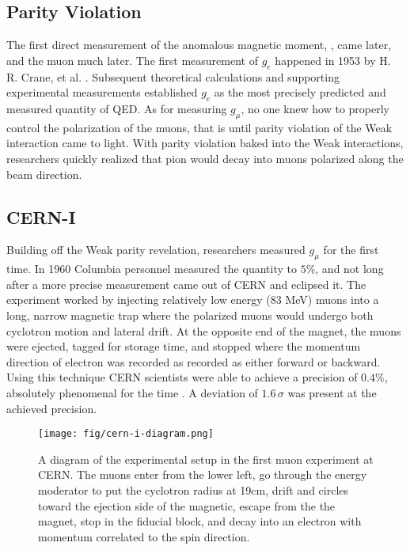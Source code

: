 \subsection{Parity Violation}
The first direct measurement of the anomalous magnetic moment, \gmtwo, came later, and the muon \gmtwo much later.  The first measurement of $g_e$ happened in 1953 by H. R. Crane, et al. .  Subsequent theoretical calculations and supporting experimental measurements established $g_e$ as the most precisely predicted and measured quantity of QED.  As for measuring $g_\mu$, no one knew how to properly control the polarization of the muons, that is until parity violation of the Weak interaction came to light.  With parity violation baked into the Weak interactions, researchers quickly realized that pion would decay into muons polarized along the beam direction.  

\subsection{CERN-I}
Building off the Weak parity revelation, researchers measured $g_\mu$ for the first time.  In 1960 Columbia personnel measured the quantity to $5\%$, and not long after a more precise measurement came out of CERN and eclipsed it.  The experiment worked by injecting relatively low energy (83 MeV) muons into a long, narrow magnetic trap where the polarized muons would undergo both cyclotron motion and lateral drift. At the opposite end of the magnet, the muons were ejected, tagged for storage time, and stopped where the momentum direction of electron was recorded as recorded as either forward or backward.  Using this technique CERN scientists were able to achieve a precision of $0.4\%$, absolutely phenomenal for the time \cite{cern-i}.  A deviation of $1.6\,\sigma$ was present at the achieved precision.

\begin{figure}
\centering
\texttt{[image: fig/cern-i-diagram.png]}
\label{fig:cern-i-diagram}
\caption{A diagram of the experimental setup in the first muon \gmtwo experiment at CERN. The muons enter from the lower left, go through the energy moderator to put the cyclotron radius at 19cm, drift and circles toward the ejection side of the magnetic, escape from the the magnet, stop in the fiducial block, and decay into an electron with momentum correlated to the spin direction.}
\end{figure}

